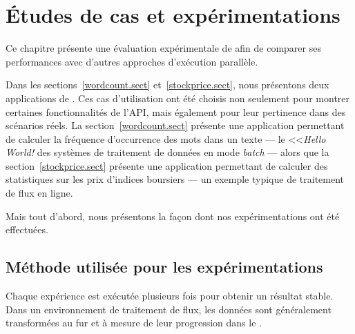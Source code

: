 
\chapter{\'Etudes de cas et exp\'erimentations}
\label{experiences.chap}


Ce chapitre pr\'esente une \'evaluation exp\'erimentale de  afin de comparer ses performances avec d'autres approches d'ex\'ecution parall\`ele.   

Dans les sections~\ref{wordcount.sect} et~\ref{stockprice.sect}, nous pr\'esentons deux applications de . Ces cas d'utilisation ont \'et\'e choisis non seulement pour montrer certaines fonctionnalit\'es de l'API, mais \'egalement pour leur pertinence dans des sc\'enarios r\'eels. La section~\ref{wordcount.sect} pr\'esente une application permettant de calculer la fr\'equence d'occurrence des mots dans un texte --- le <<\emph{Hello World!} des syst\`emes de traitement de donn\'ees en mode \emph{batch} --- alors que la section~\ref{stockprice.sect} pr\'esente une application permettant de calculer des statistiques sur les prix d'indices boursiers --- un exemple typique de traitement de flux en ligne.

Mais tout d'abord, nous pr\'esentons la fa\c{c}on dont nos
exp\'erimentations ont \'et\'e effectu\'ees.

\section{M\'ethode utilis\'ee pour les exp\'erimentations}



Chaque exp\'erience est ex\'ecut\'ee plusieurs fois pour obtenir un r\'esultat stable. Dans un environnement de traitement de flux, les donn\'ees sont g\'en\'eralement transform\'ees au fur et \`a mesure de leur progression dans le .


